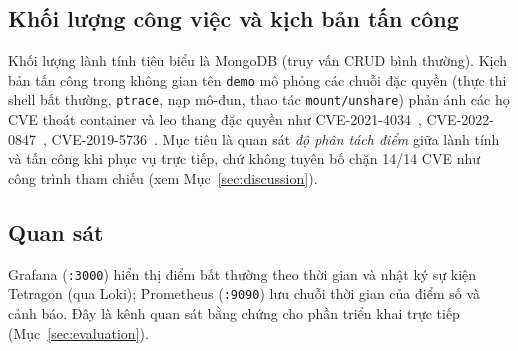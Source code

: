 \subsection{Khối lượng công việc và kịch bản tấn công}
Khối lượng lành tính tiêu biểu là MongoDB (truy vấn CRUD bình thường). Kịch bản
tấn công trong không gian tên \texttt{demo} mô phỏng các chuỗi đặc quyền (thực thi
shell bất thường, \texttt{ptrace}, nạp mô-đun, thao tác \texttt{mount/unshare})
phản ánh các họ CVE thoát container và leo thang đặc quyền như
CVE-2021-4034~\cite{cve_2021_4034}, CVE-2022-0847~\cite{cve_2022_0847},
CVE-2019-5736~\cite{cve_2019_5736}. Mục tiêu là quan sát \emph{độ phân tách điểm}
giữa lành tính và tấn công khi phục vụ trực tiếp, chứ không tuyên bố chặn 14/14
CVE như công trình tham chiếu (xem Mục~\ref{sec:discussion}).

\subsection{Quan sát}
Grafana (\texttt{:3000}) hiển thị điểm bất thường theo thời gian và nhật ký sự
kiện Tetragon (qua Loki); Prometheus (\texttt{:9090}) lưu chuỗi thời gian của điểm
số và cảnh báo. Đây là kênh quan sát bằng chứng cho phần triển khai trực tiếp
(Mục~\ref{sec:evaluation}).
